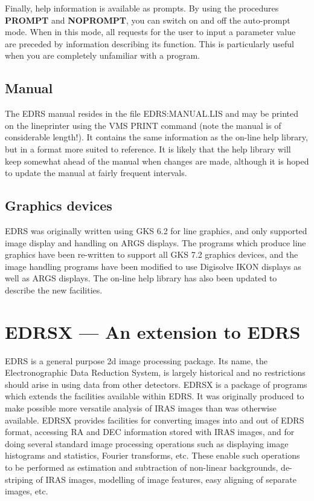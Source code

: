 Finally, help information is available as prompts.
By using the procedures {\bf PROMPT} and {\bf NOPROMPT}, you can switch on and
off the auto-prompt mode.
When in this mode, all requests for the user to input a parameter value are
preceded by information describing its function.
This is particularly useful when you are completely unfamiliar with a program.
\subsection {Manual}
The EDRS manual resides in the file EDRS:MANUAL.LIS and may be printed on the
lineprinter using the VMS PRINT command (note the manual is of considerable
length!).
It contains the same information as the on-line help library, but in a format
more suited to reference.
It is likely that the help library will keep somewhat ahead of the manual when
changes are made, although it is hoped to update the manual at fairly frequent
intervals.
\subsection {Graphics devices}
EDRS was originally written using GKS 6.2 for line graphics, and only supported
image display and handling on ARGS displays.
The programs which produce line graphics have been re-written to support all
GKS 7.2 graphics devices, and the image handling programs have been modified to
use Digisolve IKON displays as well as ARGS displays.
The on-line help library has also been updated to describe the new facilities. 

\section {EDRSX --- An extension to EDRS}

EDRS is a general purpose 2d image processing package.
Its name, the Electronographic Data  Reduction System, is largely historical and
no restrictions should arise in using data from other detectors.
EDRSX is a package of programs which extends the facilities available within
EDRS.
It was originally produced to make possible more versatile analysis of IRAS
images than was otherwise available.
EDRSX provides facilities for converting images into and out of EDRS format,
accessing RA and DEC information stored with IRAS images, and for doing several
standard image processing operations such as displaying image histograms and
statistics, Fourier transforms, etc.
These enable such operations to be performed as estimation and subtraction of
non-linear backgrounds, de-striping of IRAS images, modelling of image features,
easy aligning of separate images, etc.

